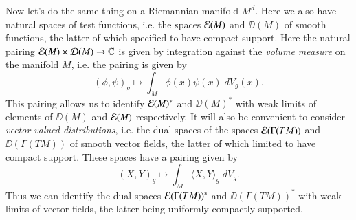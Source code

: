 %
%
%
%

Now let's do the same thing on a Riemannian manifold $M^d$. Here we also have natural spaces of test functions, i.e. the spaces $\operatorname{\mathcal{E}}(M)$ and $\DD(M)$ of smooth functions, the latter of which specified to have compact support. Here the natural pairing $\operatorname{\mathcal{E}}(M) \times \operatorname{\mathcal{D}}(M) \to \operatorname{\mathbb{C}}$ is given by integration against the \emph{volume measure} on the manifold $M$, i.e. the pairing is given by
%
\[ (\phi,\psi)_g \mapsto \int_M \phi(x) \psi(x)\; dV_g(x). \]
%
This pairing allows us to identify $\operatorname{\mathcal{E}}(M)^*$ and $\DD(M)^*$ with weak limits of elements of $\DD(M)$ and $\operatorname{\mathcal{E}}(M)$ respectively. It will also be convenient to consider \emph{vector-valued distributions}, i.e. the dual spaces of the spaces $\operatorname{\mathcal{E}}(\Gamma(TM))$ and $\DD(\Gamma(TM))$ of smooth vector fields, the latter of which limited to have compact support. These spaces have a pairing given by
%
\[ (X,Y)_g \mapsto \int_M \langle X, Y \rangle_g\; dV_g. \]
%
Thus we can identify the dual spaces $\operatorname{\mathcal{E}}(\Gamma(TM))^*$ and $\DD(\Gamma(TM))^*$ with weak limits of vector fields, the latter being uniformly compactly supported.

